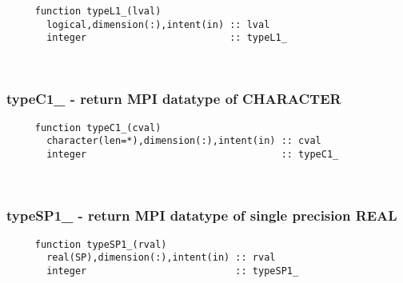 \begin{verbatim} 
     function typeL1_(lval)
       logical,dimension(:),intent(in) :: lval
       integer                         :: typeL1_
 \end{verbatim}%
 
 
\mbox{}\hrulefill\ 
 
  \subsubsection{typeC1\_ - return MPI datatype of CHARACTER}

\begin{verbatim} 
     function typeC1_(cval)
       character(len=*),dimension(:),intent(in) :: cval
       integer                                  :: typeC1_
 \end{verbatim}%
 
 
\mbox{}\hrulefill\ 
 
  \subsubsection{typeSP1\_ - return MPI datatype of single precision REAL}

\begin{verbatim} 
     function typeSP1_(rval)
       real(SP),dimension(:),intent(in) :: rval
       integer                          :: typeSP1_
 \end{verbatim}%
 
 
\mbox{}\hrulefill\  

